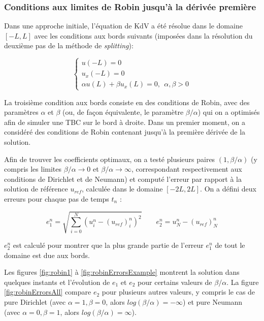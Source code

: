 \subsubsection{Conditions aux limites de Robin jusqu'à la dérivée première}

\indent Dans une approche initiale, l'équation de KdV a été résolue dans le domaine $[-L,L]$ avec les conditions aux bords suivants (imposées dans la résolution du deuxième pas de la méthode de \emph{splitting}):

\begin{equation*}
\begin{cases}
    u(-L) = 0 \\
    u_x(-L) = 0 \\
    \alpha u(L) + \beta u_x(L) = 0,  \ \ \alpha,\beta > 0
\end{cases}
\end{equation*}

\indent La troisième condition aux bords consiste en des conditions de Robin, avec des paramètres $\alpha$ et $\beta$ (ou, de façon équivalente, le paramètre  $\beta/\alpha$) qui on a optimisés afin de simuler une TBC sur le bord à droite. Dans un premier moment, on a considéré des conditions de Robin contenant jusqu'à la première dérivée de la solution.

\indent Afin de trouver les coefficients optimaux, on a testé plusieurs paires $(1,\beta/\alpha)$ (y compris les limites $\beta/\alpha \rightarrow 0$ et $\beta/\alpha \rightarrow \infty$, correspondant respectivement aux conditions de Dirichlet et de Neumann) et computé l'erreur par rapport à la solution de référence $u_{ref}$, calculée dans le domaine $[-2L,2L]$. On a défini deux erreurs pour chaque pas de temps $t_n$ :

\begin{equation*}
e_1^n = \sqrt{\sum_{i=0}^N{\left( u^n_i - (u_{ref})^n_i\right)^2}} \qquad
e_2^n =  u^n_N - (u_{ref})^n_N
\end{equation*}

\indent $e_2^n$ est calculé pour montrer que la plus grande partie de l'erreur $e_1^n$ de tout le domaine est due aux bords.
 
\indent Les figures \ref{fig:robin1} à \ref{fig:robinErrorsExample} montrent la solution dans quelques instants et l'évolution de $e_1$ et $e_2$ pour certains valeurs de $\beta/\alpha$. La figure \ref{fig:robinErrorsAll} compare $e_2$  pour plusieurs autres valeurs, y compris le cas de pure Dirichlet  (avec $\alpha = 1, \beta = 0$, alors $log(\beta/\alpha) = -\infty$) et pure Neumann (avec $\alpha = 0, \beta = 1$, alors $log(\beta/\alpha) = \infty$).

